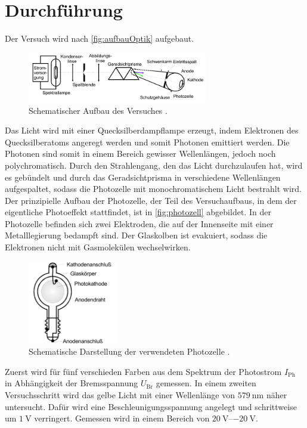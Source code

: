 \section{Durchführung}
\label{sec:Durchführung}

Der Versuch wird nach \autoref{fig:aufbauOptik} aufgebaut.
\begin{figure}[H]
    \centering
    \includegraphics[width = 0.7\textwidth]{data/optischerTeil.png}
    \caption{Schematischer Aufbau des Versuches \cite{Anleitung500}.}
    \label{fig:aufbauOptik}
\end{figure}

\noindent
Das Licht wird mit einer Quecksilberdampflampe erzeugt, indem Elektronen des Quecksilberatoms angeregt werden und somit Photonen emittiert werden.
Die Photonen sind somit in einem Bereich gewisser Wellenlängen, jedoch noch polychromatisch.
Durch den Strahlengang, den das Licht durchzulaufen hat, wird es gebündelt und durch das Geradsichtprisma in verschiedene Wellenlängen aufgespaltet, sodass
die Photozelle mit monochromatischem Licht bestrahlt wird. \newline
Der prinzipielle Aufbau der Photozelle, der Teil des Versuchaufbaus, in dem der eigentliche Photoeffekt
stattfindet, ist in \autoref{fig:photozell} abgebildet. In der Photozelle befinden sich zwei Elektroden, die auf der Innenseite 
mit einer Metalllegierung bedampft sind. Der Glaskolben ist evakuiert, sodass die Elektronen nicht mit Gasmolekülen wechselwirken.
\begin{figure}[H]
    \centering
    \includegraphics[width=0.35\textwidth]{data/photozelle.png}
    \caption{Schematische Darstellung der verwendeten Photozelle \cite{Anleitung500}.}
    \label{fig:photozell}
\end{figure}

\noindent
Zuerst wird für fünf verschieden Farben aus dem Spektrum der Photostrom $I_{\text{Ph}}$ in Abhängigkeit der Bremsspannung $U_{\text{Br}}$ gemessen.
In einem zweiten Versuchsschritt wird das gelbe Licht mit einer Wellenlänge von $\SI{579}{\nano\metre}$ näher untersucht. Dafür wird eine Beschleunigungsspannung
angelegt und schrittweise um $\SI{1}{\volt}$ verringert. Gemessen wird in einem Bereich von $\SIrange{20}{-20}{\volt}$.